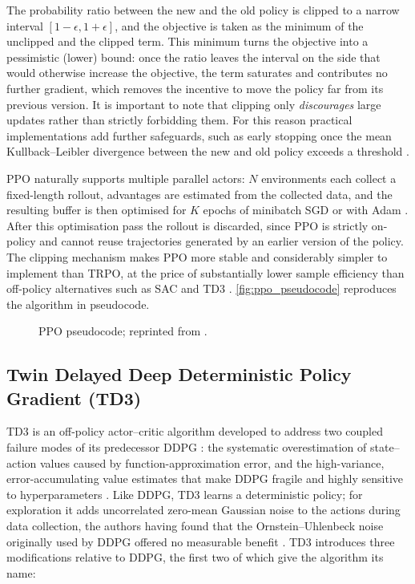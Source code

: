 The probability ratio between the new and the old policy is clipped to a narrow interval $[1-\epsilon, 1+\epsilon]$, and the objective is taken as the minimum of the unclipped and the clipped term. This minimum turns the objective into a pessimistic (lower) bound: once the ratio leaves the interval on the side that would otherwise increase the objective, the term saturates and contributes no further gradient, which removes the incentive to move the policy far from its previous version. It is important to note that clipping only \emph{discourages} large updates rather than strictly forbidding them. For this reason practical implementations add further safeguards, such as early stopping once the mean Kullback--Leibler divergence between the new and old policy exceeds a threshold \cite{openai_proximal_nodate, schulman_proximal_2017}.

\ac{PPO} naturally supports multiple parallel actors: $N$ environments each collect a fixed-length rollout, advantages are estimated from the collected data, and the resulting buffer is then optimised for $K$ epochs of minibatch \ac{SGD} or with Adam \cite{kingma_adam_2017, schulman_proximal_2017}. After this optimisation pass the rollout is discarded, since \ac{PPO} is strictly on-policy and cannot reuse trajectories generated by an earlier version of the policy. The clipping mechanism makes \ac{PPO} more stable and considerably simpler to implement than \ac{TRPO}, at the price of substantially lower sample efficiency than off-policy alternatives such as \ac{SAC} and \ac{TD3} \cite{schulman_proximal_2017}. \autoref{fig:ppo_pseudocode} reproduces the algorithm in pseudocode.

\begin{figure}[htbp]
  \centering
  
  \caption[PPO pseudocode]{PPO pseudocode; reprinted from \cite{openai_proximal_nodate}.}
  \label{fig:ppo_pseudocode}
\end{figure}

\subsection{Twin Delayed Deep Deterministic Policy Gradient (TD3)}
\label{subsec:theory_td3}
\ac{TD3} \cite{fujimoto_addressing_2018} is an off-policy actor--critic algorithm developed to address two coupled failure modes of its predecessor \ac{DDPG} \cite{lillicrap_continuous_2019}: the systematic overestimation of state--action values caused by function-approximation error, and the high-variance, error-accumulating value estimates that make \ac{DDPG} fragile and highly sensitive to hyperparameters \cite{openai_twin_nodate, fujimoto_addressing_2018}. Like \ac{DDPG}, \ac{TD3} learns a deterministic policy; for exploration it adds uncorrelated zero-mean Gaussian noise to the actions during data collection, the authors having found that the Ornstein--Uhlenbeck noise originally used by \ac{DDPG} offered no measurable benefit \cite{fujimoto_addressing_2018}. \ac{TD3} introduces three modifications relative to \ac{DDPG}, the first two of which give the algorithm its name:

